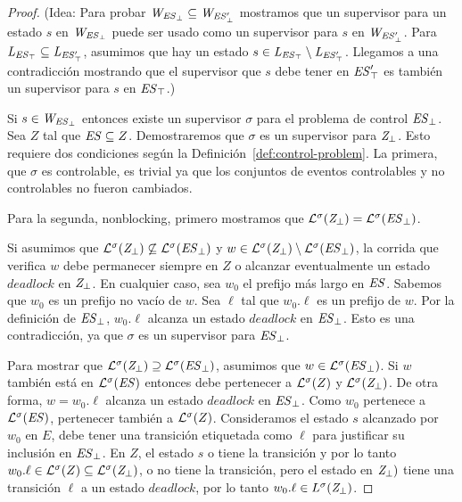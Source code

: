 \begin{proof}
	
(Idea:	Para probar $\mathit{W_{\mathit{\mathit{ES}_{\bot}}}} \subseteq \mathit{W_{\mathit{\mathit{ES}'_{\bot}}}}$ mostramos que un supervisor para un estado $s$ en $\mathit{W_{\mathit{\mathit{ES}_{\bot}}}}$ 
	puede ser usado como un supervisor para $s$ en $\mathit{W_{\mathit{\mathit{ES}'_{\bot}}}}$. Para $\mathit{L_{\mathit{\mathit{ES}_{\top}}}} \subseteq 
	\mathit{L_{\mathit{\mathit{ES}'_{\top}}}}$, asumimos que hay un estado $s \in \mathit{L_{\mathit{\mathit{ES}_{\top}}}} \setminus \mathit{L_{\mathit{\mathit{ES}'_{\top}}}} $. Llegamos a una contradicción mostrando que el supervisor que $s$ debe tener en
	$\mathit{\mathit{ES}'_{\top}}$ es también un supervisor para $s$ en $\mathit{\mathit{ES}_{\top}}$.)



Si $s \in \mathit{W_{\mathit{\mathit{ES}_{\bot}}}} $ entonces existe un supervisor $\sigma$ para el problema de control $\mathit{\mathit{ES}_{\bot}}$. Sea $Z$ tal que $\mathit{ES} \subseteq Z$. Demostraremos que $\sigma$ es un supervisor para $\mathit{Z_{\bot}}$. Esto requiere dos condiciones según la Definición~\ref{def:control-problem}. La primera, que $\sigma$ es controlable, es trivial ya que los conjuntos de eventos controlables y no controlables no fueron cambiados. 

Para la segunda, nonblocking, primero mostramos que $\mathcal{L}^\sigma(\mathit{Z_{\bot}}) = 
\mathcal{L}^\sigma(\mathit{\mathit{ES}_{\bot}})$. 

Si asumimos que $\mathcal{L}^\sigma(\mathit{Z_{\bot}}) \not\subseteq \mathcal{L}^\sigma(\mathit{\mathit{ES}_{\bot}})$ y $w \in 
\mathcal{L}^\sigma(\mathit{Z_{\bot}}) \setminus \mathcal{L}^\sigma(\mathit{\mathit{ES}_{\bot}})$, la corrida que verifica $w$ debe permanecer siempre en $Z$ o alcanzar eventualmente un estado $deadlock$ en $\mathit{Z_{\bot}}$. En cualquier caso, sea $w_0$ el prefijo más largo en $\mathit{ES}$. 
Sabemos que $w_0$ es un prefijo no vacío de $w$. Sea $\ell$ tal que $w_0.\ell$ es un prefijo de $w$. 
Por la definición de $\mathit{\mathit{ES}_{\bot}}$, $w_0.\ell$ alcanza un estado $deadlock$ en $\mathit{\mathit{ES}_{\bot}}$. Esto es una contradicción, ya que $\sigma$ es un supervisor para
$\mathit{\mathit{ES}_{\bot}}$. 

Para mostrar que $\mathcal{L}^\sigma(\mathit{Z_{\bot}}) \supseteq \mathcal{L}^\sigma(\mathit{\mathit{ES}_{\bot}})$, asumimos que $w \in \mathcal{L}^\sigma(\mathit{\mathit{ES}_{\bot}})$. Si $w$ también está en $\mathcal{L}^\sigma(\mathit{ES})$ entonces debe pertenecer a $\mathcal{L}^\sigma(Z)$ y $\mathcal{L}^\sigma(\mathit{Z_{\bot}})$. De otra forma, $w = w_0.\ell$ alcanza un estado $deadlock$ en $\mathit{\mathit{ES}_{\bot}}$. Como $w_0$ pertenece a $\mathcal{L}^\sigma(\mathit{ES})$, pertenecer también a $\mathcal{L}^\sigma(Z)$. Consideramos el estado $s$ alcanzado por  $w_0$ en $E$, debe tener una transición etiquetada como $\ell$ para justificar su inclusión en $\mathit{\mathit{ES}_{\bot}}$. En $Z$, el estado $s$ o tiene la transición y por lo tanto $w_0.\ell \in \mathcal{L}^\sigma(Z) \subseteq 
\mathcal{L}^\sigma(\mathit{Z_{\bot}})$, o no tiene la transición, pero el estado en $\mathit{Z_{\bot}})$ tiene una transición $\ell$ a un estado $deadlock$, por lo tanto $w_0.\ell \in 
L^\sigma(\mathit{Z_{\bot}})$.


\end{proof}
